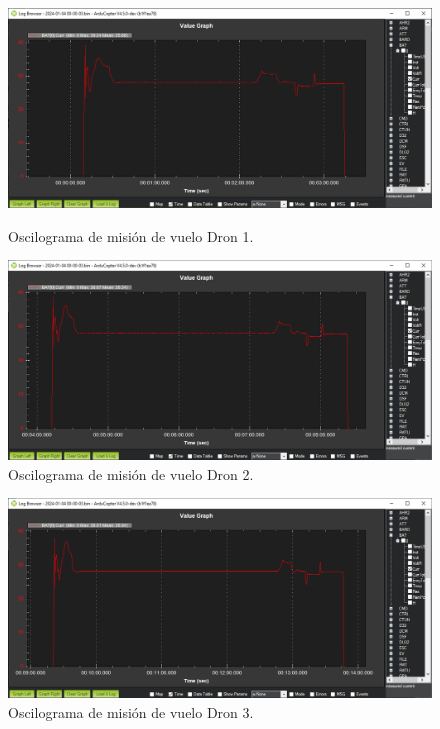 \begin{figure}[H]
    \centering
    \includegraphics[width=0.9\linewidth]{imagenes/corr_2_1.png}
    \caption{Oscilograma de misión de vuelo Dron 1.}
\vspace{1cm}
 \centering
    \includegraphics[width=0.9\linewidth]{imagenes/corr_2_2.png}
    \caption{Oscilograma de misión de vuelo Dron 2.}
\end{figure}
\newpage
\begin{figure}[H]    
    \centering
    \includegraphics[width=0.9\linewidth]{imagenes/corr_2_3.png}
    \caption{Oscilograma de misión de vuelo Dron 3.}
\end{figure}




\endinput